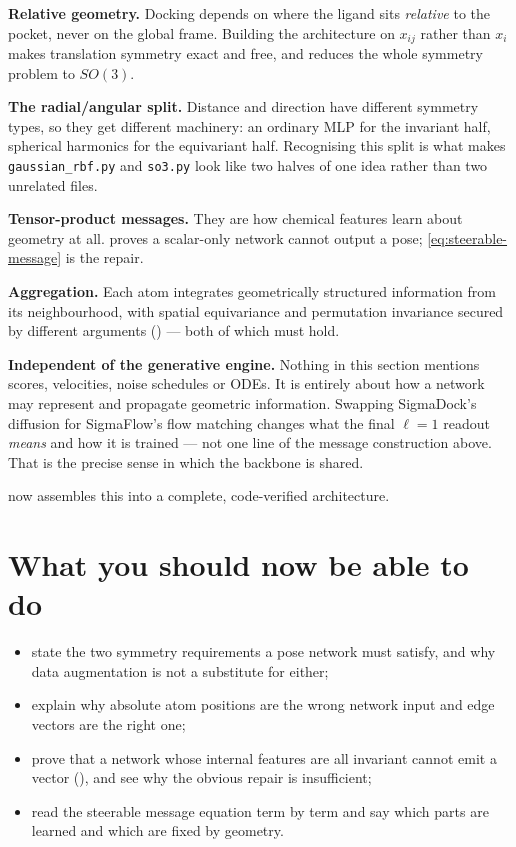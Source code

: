 \documentclass[11pt,a4paper]{report}
\theoremstyle{definition}
\theoremstyle{remark}
\newcommand{\file}[1]{\texttt{#1}}
\begin{document}
\begin{tcolorbox}[colback=blue!3,colframe=blue!40!black,title={Why this matters for SigmaFlow}]
\textbf{Relative geometry.} Docking depends on where the ligand sits
\emph{relative} to the pocket, never on the global frame. Building the
architecture on $x_{ij}$ rather than $x_i$ makes translation symmetry exact
and free, and reduces the whole symmetry problem to $SO(3)$.

\textbf{The radial/angular split.} Distance and direction have different
symmetry types, so they get different machinery: an ordinary MLP for the
invariant half, spherical harmonics for the equivariant half. Recognising
this split is what makes \file{gaussian\_rbf.py} and \file{so3.py} look like
two halves of one idea rather than two unrelated files.

\textbf{Tensor-product messages.} They are how chemical features learn about
geometry at all.  proves a
scalar-only network cannot output a pose; \eqref{eq:steerable-message} is
the repair.

\textbf{Aggregation.} Each atom integrates geometrically structured
information from its neighbourhood, with spatial equivariance and
permutation invariance secured by different arguments
() --- both of which must hold.

\textbf{Independent of the generative engine.} Nothing in this section
mentions scores, velocities, noise schedules or ODEs. It is entirely about
how a network may represent and propagate geometric information. Swapping
SigmaDock's diffusion for SigmaFlow's flow matching changes what the final
$\ell=1$ readout \emph{means} and how it is trained --- not one line of the
message construction above. That is the precise sense in which the backbone
is shared.
\end{tcolorbox}

 now assembles this into a
complete, code-verified architecture.


\section{What you should now be able to do}

\begin{itemize}[nosep]
\item state the two symmetry requirements a pose network must satisfy, and why data augmentation is not a substitute for either;
\item explain why absolute atom positions are the wrong network input and edge vectors are the right one;
\item prove that a network whose internal features are all invariant cannot emit a vector (), and see why the obvious repair is insufficient;
\item read the steerable message equation term by term and say which parts are learned and which are fixed by geometry.
\end{itemize}
\end{document}
